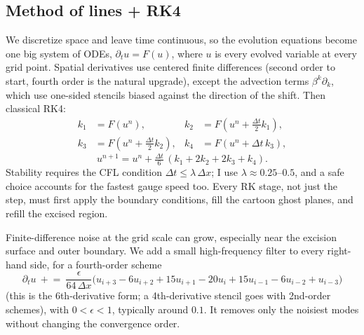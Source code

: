 \subsection{Method of lines + RK4}

We discretize space and leave time continuous, so the evolution equations become one
big system of ODEs, $\partial_t u=F(u)$, where $u$ is every evolved variable at every
grid point. Spatial derivatives use centered finite differences (second order to start,
fourth order is the natural upgrade), except the advection terms $\beta^k\partial_k$,
which use one-sided stencils biased against the direction of the shift. Then classical RK4:
\begin{align*}
	k_1 & =F(u^n),                      & k_2 & =F(u^n+\tfrac{\Delta t}2k_1), \\
	k_3 & =F(u^n+\tfrac{\Delta t}2k_2), & k_4 & =F(u^n+\Delta t\,k_3),
\end{align*}
\[
	u^{n+1}=u^n+\tfrac{\Delta t}6\,(k_1+2k_2+2k_3+k_4).
\]
Stability requires the CFL condition $\Delta t\le\lambda\,\Delta x$; I use
$\lambda\approx0.25$--$0.5$, and a safe choice accounts for the fastest gauge speed too.
Every RK stage, not just the step, must first apply the boundary conditions, fill the
cartoon ghost planes, and refill the excised region.

Finite-difference noise at the grid scale can grow, especially near the excision
surface and outer boundary. We add a small high-frequency filter to every right-hand
side, for a fourth-order scheme
\[
	\partial_tu\ \mathrel{+}=\ \frac{\epsilon}{64\,\Delta x}\big(u_{i+3}-6u_{i+2}+15u_{i+1}-20u_i+15u_{i-1}-6u_{i-2}+u_{i-3}\big)
\]
(this is the 6th-derivative form; a 4th-derivative stencil goes with 2nd-order schemes),
with $0<\epsilon<1$, typically around $0.1$. It removes only the noisiest modes
without changing the convergence order.


